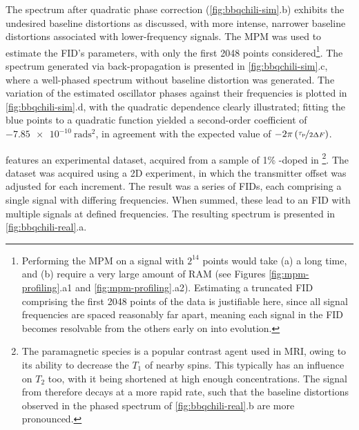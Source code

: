 The spectrum after quadratic phase correction (\cref{fig:bbqchili-sim}.b)
exhibits the undesired baseline distortions as discussed, with more intense,
narrower baseline distortions associated with lower-frequency signals.
The \ac{MPM} was used to estimate the \ac{FID}'s parameters,
with only the first 2048 points considered\footnote{
    Performing the \ac{MPM} on a signal with $2^{14}$ points would take (a) a
    long time, and (b) require a very large amount of \ac{RAM} (see Figures
    \ref{fig:mpm-profiling}.a1 and \ref{fig:mpm-profiling}.a2).
    Estimating a truncated \ac{FID} comprising the first 2048 points of the
    data is justifiable here, since all signal frequencies are spaced
    reasonably far apart, meaning each signal in the \ac{FID} becomes
    resolvable from the others early on into evolution.
}. The spectrum generated via back-propagation is presented in
\cref{fig:bbqchili-sim}.c, where a well-phased spectrum without baseline
distortion was generated. The variation of the estimated oscillator
phases against their frequencies is plotted in \cref{fig:bbqchili-sim}.d, with
the quadratic dependence clearly illustrated; fitting the blue points to a
quadratic function yielded a second-order coefficient of
$\qty{-7.85e-10}{\radian\second\squared}$, in agreement with the expected value
of $-2 \pi \left(\nicefrac{\tau_{\text{p}}}{2 \Updelta F}\right)$.

 features an experimental dataset, acquired
from a sample of 1\% -doped  in \footnote{
    The paramagnetic species  is a popular
    contrast agent used in \ac{MRI}, owing to its ability to decrease the $T_1$
    of nearby spins. This typically has an influence on $T_2$ too, with it
    being shortened at high enough concentrations.
    The signal from  therefore decays at a more rapid rate, such that
    the baseline distortions observed in the phased spectrum of
    \cref{fig:bbqchili-real}.b are more pronounced.
}.
The dataset was acquired using a \ac{2D} experiment, in which the transmitter
offset was adjusted for each increment. The result was a series of \acp{FID},
each comprising a single  signal with differing frequencies.
When summed, these lead to an \ac{FID} with multiple signals at defined
frequencies. The resulting spectrum is presented in
\cref{fig:bbqchili-real}.a.

